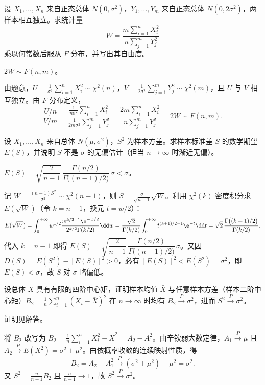 \begin{exercise}
设 $X_1,\ldots,X_n$ 来自正态总体 $N(0,\sigma^2)$，$Y_1,\ldots,Y_m$ 来自正态总体 $N(0,2\sigma^2)$，两样本相互独立。求统计量
\[
  W=\frac{m\sum_{i=1}^{n}X_i^2}{n\sum_{j=1}^{m}Y_j^2}
\]
乘以何常数后服从 $F$ 分布，并写出其自由度。
\begin{answer}
$2W\sim F(n,m)$。
\end{answer}
\begin{solution}
由题意，$U=\frac{1}{\sigma^2}\sum_{i=1}^{n}X_i^2\sim\chi^2(n)$，$V=\frac{1}{2\sigma^2}\sum_{j=1}^{m}Y_j^2\sim\chi^2(m)$，且 $U$ 与 $V$ 相互独立。由 $F$ 分布定义，
\[
  \frac{U/n}{V/m}=\frac{\frac{1}{n\sigma^2}\sum_{i=1}^{n}X_i^2}{\frac{1}{2m\sigma^2}\sum_{j=1}^{m}Y_j^2}
  =\frac{2m\sum_{i=1}^{n}X_i^2}{n\sum_{j=1}^{m}Y_j^2}=2W\sim F(n,m).
\]
\end{solution}
\end{exercise}

\begin{exercise}
设 $X_1,\ldots,X_n$ 来自总体 $N(\mu,\sigma^2)$，$S^2$ 为样本方差。求样本标准差 $S$ 的数学期望 $E(S)$，并说明 $S$ 不是 $\sigma$ 的无偏估计（但当 $n\to\infty$ 时渐近无偏）。
\begin{answer}
$E(S)=\sqrt{\dfrac{2}{n-1}}\,\dfrac{\Gamma(n/2)}{\Gamma\bigl((n-1)/2\bigr)}\,\sigma<\sigma$。
\end{answer}
\begin{solution}
记 $W=\frac{(n-1)S^2}{\sigma^2}\sim\chi^2(n-1)$，则 $S=\frac{\sigma}{\sqrt{n-1}}\sqrt{W}$。利用 $\chi^2(k)$ 密度积分求 $E(\sqrt{W})$（令 $k=n-1$，换元 $t=w/2$）：
\[
  E(\sqrt{W})=\int_{0}^{+\infty}w^{1/2}\frac{w^{k/2-1}\e^{-w/2}}{2^{k/2}\Gamma(k/2)}\dd w
  =\frac{\sqrt{2}}{\Gamma(k/2)}\int_{0}^{+\infty}t^{(k+1)/2-1}\e^{-t}\dd t
  =\sqrt{2}\,\frac{\Gamma\bigl((k+1)/2\bigr)}{\Gamma(k/2)}.
\]
代入 $k=n-1$ 即得 $E(S)=\sqrt{\dfrac{2}{n-1}}\,\dfrac{\Gamma(n/2)}{\Gamma\bigl((n-1)/2\bigr)}\,\sigma$。又因 $D(S)=E(S^2)-[E(S)]^2>0$，必有 $[E(S)]^2<E(S^2)=\sigma^2$，即 $E(S)<\sigma$，故 $S$ 对 $\sigma$ 略偏低。
\end{solution}
\end{exercise}

\begin{exercise}
设总体 $X$ 具有有限的四阶中心矩，证明样本均值 $\bar{X}$ 与任意样本方差（样本二阶中心矩）$B_2=\frac{1}{n}\sum_{i=1}^{n}(X_i-\bar{X})^2$ 在 $n\to\infty$ 时均有 $B_2\xrightarrow{P}\sigma^2$，进而 $S^2\xrightarrow{P}\sigma^2$。
\begin{answer}
证明见解答。
\end{answer}
\begin{solution}
将 $B_2$ 改写为 $B_2=\frac{1}{n}\sum_{i=1}^{n}X_i^2-\bar{X}^2=A_2-A_1^2$。由辛钦弱大数定律，$A_1\xrightarrow{P}\mu$ 且 $A_2\xrightarrow{P} E(X^2)=\sigma^2+\mu^2$。由依概率收敛的连续映射性质，得
\[
  B_2=A_2-A_1^2\xrightarrow{P}(\sigma^2+\mu^2)-\mu^2=\sigma^2.
\]
又 $S^2=\frac{n}{n-1}B_2$ 且 $\frac{n}{n-1}\to 1$，故 $S^2\xrightarrow{P}\sigma^2$。
\end{solution}
\end{exercise}
